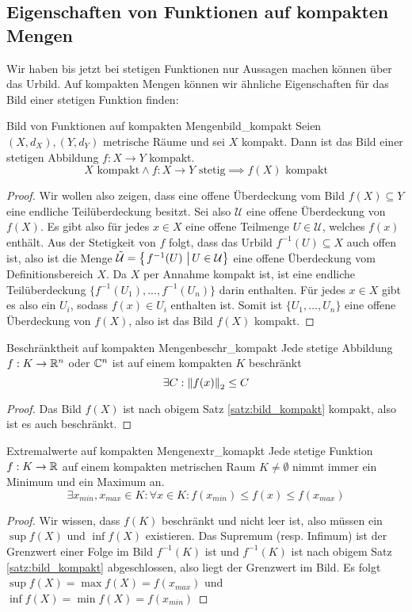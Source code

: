 \subsection{Eigenschaften von Funktionen auf kompakten Mengen}
Wir haben bis jetzt bei stetigen Funktionen nur Aussagen machen können über das Urbild. Auf kompakten Mengen können wir ähnliche Eigenschaften für das Bild einer stetigen Funktion finden:
\begin{satz}{Bild von Funktionen auf kompakten Mengen}{bild_kompakt}
Seien $(X,d_X), (Y, d_Y)$ metrische Räume und sei $X$ kompakt. Dann ist das Bild einer stetigen Abbildung $f: X \to Y$ kompakt.
$$X \text{ kompakt} \land f: X \to Y \text{ stetig} \implies f(X) \text{ kompakt}$$
\end{satz}
\begin{proof}
Wir wollen also zeigen, dass eine offene Überdeckung vom Bild $f(X) \subseteq Y$ eine endliche Teilüberdeckung besitzt. Sei also $\mathcal{U}$ eine offene Überdeckung von $f(X)$. Es gibt also für jedes $x \in X$ eine offene Teilmenge $U \in \mathcal{U}$, welches $f(x)$ enthält. Aus der Stetigkeit von $f$ folgt, dass das Urbild $f^{-1}(U) \subseteq X$ auch offen ist, also ist die Menge $\Tilde{\mathcal{U}} = \left\{\left.f^{-1}(U) \ \right| U \in \mathcal{U} \right\}$ eine offene Überdeckung vom Definitionsbereich $X$. Da $X$ per Annahme kompakt ist, ist eine endliche Teilüberdeckung $\{f^{-1}(U_1), ..., f^{-1}(U_n)\}$ darin enthalten. Für jedes $x \in X$ gibt es also ein $U_i$, sodass $f(x) \in U_i$ enthalten ist. Somit ist $\{U_1, ..., U_n\}$ eine offene Überdeckung von $f(X)$, also ist das Bild $f(X)$ kompakt.
\end{proof}

\begin{korollar}{Beschränktheit auf kompakten Mengen}{beschr_kompakt}
Jede stetige Abbildung $f: K \to \mathbb{R}^n$ oder $\mathbb{C}^n$ ist auf einem kompakten $K$ beschränkt
$$\exists C:\left\|f(x)\right\|_2\leq C$$
\end{korollar}
\begin{proof}
Das Bild $f(X)$ ist nach obigem Satz \ref{satz:bild_kompakt} kompakt, also ist es auch beschränkt.
\end{proof}

\begin{korollar}{Extremalwerte auf kompakten Mengen}{extr_komapkt}
Jede stetige Funktion $f: K \to \mathbb{R}$ auf einem kompakten metrischen Raum $K \neq \emptyset$ nimmt immer ein Minimum und ein Maximum an.
$$\exists x_{min}, x_{max} \in K: \forall x \in K: f(x_{min}) \leq f(x) \leq f(x_{max})$$
\end{korollar}
\begin{proof}
Wir wissen, dass $f(K)$ beschränkt und nicht leer ist, also müssen ein $\sup f(X)$ und $\inf f(X)$ existieren. Das Supremum (resp. Infimum) ist der Grenzwert einer Folge im Bild $f^{-1}(K)$ ist und $f^{-1}(K)$ ist nach obigem Satz \ref{satz:bild_kompakt} abgeschlossen, also liegt der Grenzwert im Bild. Es folgt $\sup f(X) = \max f(X) = f(x_{max})$ und  $\inf f(X) = \min f(X) = f(x_{min})$
\end{proof}

